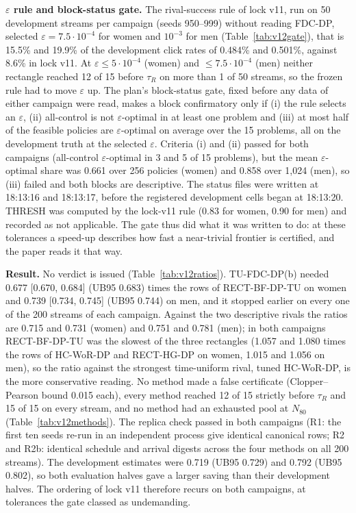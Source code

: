 \documentclass[sigconf,anonymous,review]{acmart}
\newcommand{\eps}{\varepsilon}
\begin{document}
\textbf{$\eps$ rule and block-status gate.} The rival-success rule of lock v11, run on 50 development streams per campaign (seeds 950--999) without reading FDC-DP, selected $\eps = 7.5 \cdot 10^{-4}$ for women and $10^{-3}$ for men (Table~\ref{tab:v12gate}), that is 15.5\% and 19.9\% of the development click rates of 0.484\% and 0.501\%, against 8.6\% in lock v11. At $\eps \le 5 \cdot 10^{-4}$ (women) and $\le 7.5 \cdot 10^{-4}$ (men) neither rectangle reached 12 of 15 before $\tau_R$ on more than 1 of 50 streams, so the frozen rule had to move $\eps$ up. The plan's block-status gate, fixed before any data of either campaign were read, makes a block confirmatory only if (i) the rule selects an $\eps$, (ii) all-control is not $\eps$-optimal in at least one problem and (iii) at most half of the feasible policies are $\eps$-optimal on average over the 15 problems, all on the development truth at the selected $\eps$. Criteria (i) and (ii) passed for both campaigns (all-control $\eps$-optimal in 3 and 5 of 15 problems), but the mean $\eps$-optimal share was 0.661 over 256 policies (women) and 0.858 over 1,024 (men), so (iii) failed and both blocks are descriptive. The status files were written at 18:13:16 and 18:13:17, before the registered development cells began at 18:13:20. THRESH was computed by the lock-v11 rule (0.83 for women, 0.90 for men) and recorded as not applicable. The gate thus did what it was written to do: at these tolerances a speed-up describes how fast a near-trivial frontier is certified, and the paper reads it that way.

\textbf{Result.} No verdict is issued (Table~\ref{tab:v12ratios}). TU-FDC-DP(b) needed 0.677 [0.670, 0.684] (UB95 0.683) times the rows of RECT-BF-DP-TU on women and 0.739 [0.734, 0.745] (UB95 0.744) on men, and it stopped earlier on every one of the 200 streams of each campaign. Against the two descriptive rivals the ratios are 0.715 and 0.731 (women) and 0.751 and 0.781 (men); in both campaigns RECT-BF-DP-TU was the slowest of the three rectangles (1.057 and 1.080 times the rows of HC-WoR-DP and RECT-HG-DP on women, 1.015 and 1.056 on men), so the ratio against the strongest time-uniform rival, tuned HC-WoR-DP, is the more conservative reading. No method made a false certificate (Clopper--Pearson bound 0.015 each), every method reached 12 of 15 strictly before $\tau_R$ and 15 of 15 on every stream, and no method had an exhausted pool at $N_{80}$ (Table~\ref{tab:v12methods}). The replica check passed in both campaigns (R1: the first ten seeds re-run in an independent process give identical canonical rows; R2 and R2b: identical schedule and arrival digests across the four methods on all 200 streams). The development estimates were 0.719 (UB95 0.729) and 0.792 (UB95 0.802), so both evaluation halves gave a larger saving than their development halves. The ordering of lock v11 therefore recurs on both campaigns, at tolerances the gate classed as undemanding.
\end{document}

